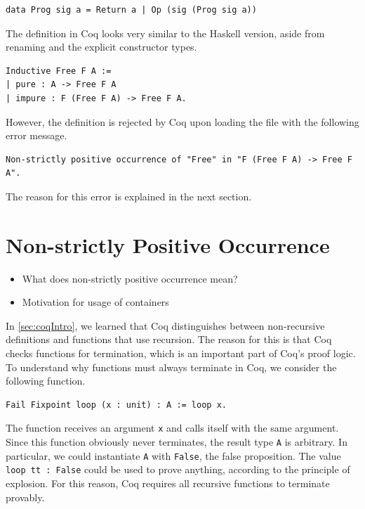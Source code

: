 \documentclass[a4paper, 11pt, fleqn, twoside]{scrreprt}
\begin{document}
\begin{verbatim}
data Prog sig a = Return a | Op (sig (Prog sig a))
\end{verbatim}

The definition in Coq looks very similar to the Haskell version, aside from 
renaming and the explicit constructor types.

\begin{verbatim}
Inductive Free F A :=
| pure : A -> Free F A
| impure : F (Free F A) -> Free F A.
\end{verbatim}

However, the definition is rejected by Coq upon loading the file with the 
following error message.

\begin{verbatim}
Non-strictly positive occurrence of "Free" in "F (Free F A) -> Free F A".
\end{verbatim}

The reason for this error is explained in the next section.

\section{Non-strictly Positive Occurrence}
\begin{itemize}
\item What does non-strictly positive occurrence mean?
\item Motivation for usage of containers
\end{itemize}

In \autoref{sec:coqIntro}, we learned that Coq distinguishes between 
non-recursive definitions and functions that use recursion. The reason for this 
is that Coq checks functions for termination, which is an important part of 
Coq's proof logic. To understand why functions must always terminate in Coq, we 
consider the following function.

\begin{verbatim}
Fail Fixpoint loop (x : unit) : A := loop x.
\end{verbatim}

The function receives an argument \texttt{x} and calls itself with the 
same argument. Since this function obviously never terminates, the result type 
\texttt{A} is arbitrary. In particular, we could instantiate 
\texttt{A} with \texttt{False}, the false proposition. The 
value \texttt{loop tt : False} could be used to prove anything,
according to the principle of explosion. For this reason, Coq requires all 
recursive functions to terminate provably.
\end{document}
